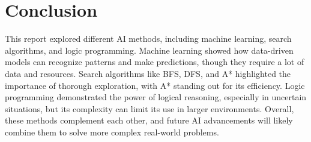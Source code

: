 \documentclass[12pt]{article}
\begin{document}
\section{Conclusion}
This report explored different AI methods, including machine learning, search algorithms, and logic programming. Machine learning showed how data-driven models can recognize patterns and make predictions, though they require a lot of data and resources. Search algorithms like BFS, DFS, and A* highlighted the importance of thorough exploration, with A* standing out for its efficiency. Logic programming demonstrated the power of logical reasoning, especially in uncertain situations, but its complexity can limit its use in larger environments. Overall, these methods complement each other, and future AI advancements will likely combine them to solve more complex real-world problems.
\end{document}
